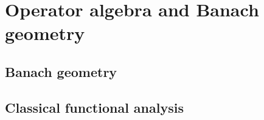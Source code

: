     \part{Operator algebra and Banach geometry}
        \chapter{Banach geometry}
            \begin{abstract}
                
            \end{abstract}
            
            \minitoc
            
            
            
            
            
            
        
    \begin{appendices}
        \chapter{Classical functional analysis}
            \begin{abstract}
            
            \end{abstract}
            
            \minitoc
            
            
    \end{appendices}
	
	\printbibliography

